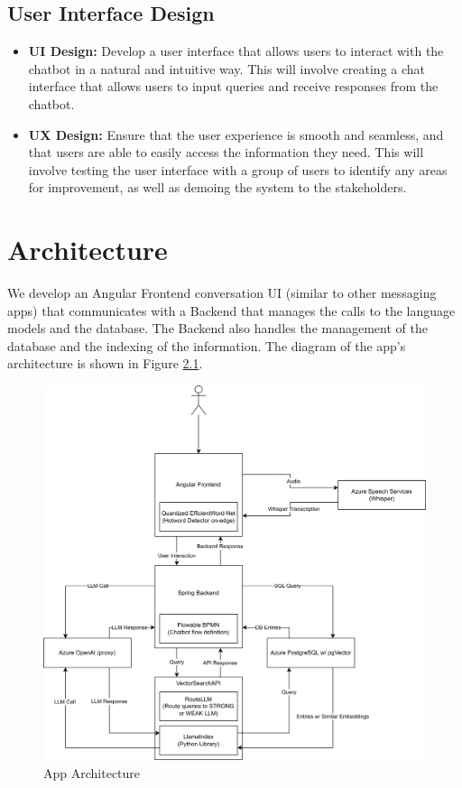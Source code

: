 \documentclass[a4paper,12pt,twoside]{ThesisStyle}
\begin{document}
\section{User Interface Design}
\label{sec:ui-design}

\begin{itemize}
  \item \textbf{UI Design:} Develop a user interface that allows users to interact with the chatbot in a natural and intuitive way. This will involve creating a chat interface that allows users to input queries and receive responses from the chatbot.
  \item \textbf{UX Design:} Ensure that the user experience is smooth and seamless, and that users are able to easily access the information they need. This will involve testing the user interface with a group of users to identify any areas for improvement, as well as demoing the system to the stakeholders.
\end{itemize}


\chapter{Architecture}

We develop an Angular Frontend conversation UI (similar to other messaging apps) that communicates with a Backend that manages the calls to the language models and the database. The Backend also handles the management of the database and the indexing of the information. The diagram of the app's architecture is shown in Figure \ref{fig:architecture}.

\begin{figure}[htb]
  \centering
  \includegraphics[width=1\textwidth]{imatges/Full DSO App Architecture.drawio.png}
  \caption{App Architecture}
  \label{fig:architecture}
\end{figure}
\end{document}
